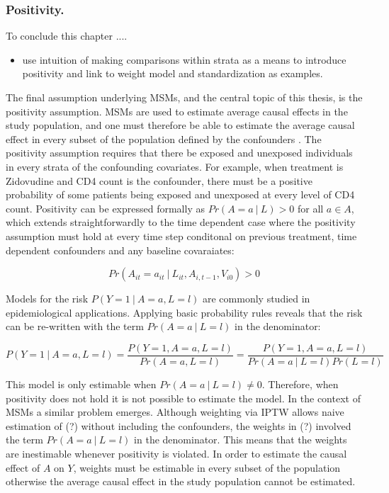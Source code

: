 \documentclass[11pt]{article}
\providecommand{\tightlist}{%
      \setlength{\itemsep}{0pt}\setlength{\parskip}{0pt}}
\begin{document}
\subsubsection{Positivity.}\label{positivity.}

To conclude this chapter ....

\begin{itemize}
\tightlist
\item
  use intuition of making comparisons within strata as a means to
  introduce positivity and link to weight model and standardization as
  examples.
\end{itemize}

The final assumption underlying MSMs, and the central topic of this
thesis, is the positivity assumption. MSMs are used to estimate average
causal effects in the study population, and one must therefore be able
to estimate the average causal effect in every subset of the population
defined by the confounders \citet{Cole2008}. The positivity assumption
requires that there be exposed and unexposed individuals in every strata
of the confounding covariates. For example, when treatment is Zidovudine
and CD4 count is the confounder, there must be a positive probability of
some patients being exposed and unexposed at every level of CD4 count.
Positivity can be expressed formally as \(Pr(A=a\ |\ L) > 0\) for all
\(a \in A\), which extends straightforwardly to the time dependent case
where the positivity assumption must hold at every time step conditonal
on previous treatment, time dependent confounders and any baseline
covaraiates:

\[Pr(A_{it}=a_{it}\ |\ L_{it}, A_{i, t-1}, V_{i0}) > 0\]

Models for the risk \(P(Y=1\ |\ A=a, L=l)\) are commonly studied in
epidemiological applications. Applying basic probability rules reveals
that the risk can be re-written with the term \(Pr(A=a\ |\ L=l)\) in the
denominator:

\[P(Y=1\ |\ A=a, L=l) = \frac{P(Y=1, A=a, L=l)}{Pr(A=a, L=l)} = \frac{P(Y=1, A=a, L=l)}{Pr(A=a\ |\ L=l)Pr(L=l)}\]

This model is only estimable when \(Pr(A=a\ |\ L=l) \neq 0\). Therefore,
when positivity does not hold it is not possible to estimate the model.
In the context of MSMs a similar problem emerges. Although weighting via
IPTW allows naive estimation of (?) without including the confounders,
the weights in (?) involved the term \(Pr(A=a\ |\ L=l)\) in the
denominator. This means that the weights are inestimable whenever
positivity is violated. In order to estimate the causal effect of \(A\)
on \(Y\), weights must be estimable in every subset of the population
otherwise the average causal effect in the study population cannot be
estimated. \linebreak
\end{document}
